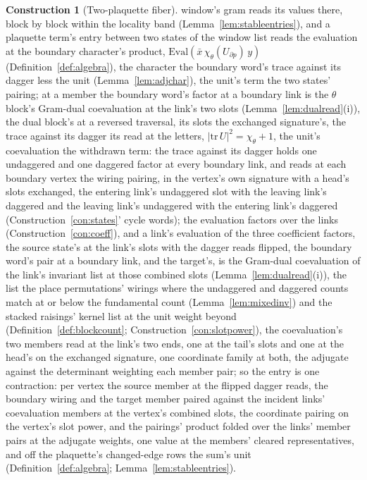 \documentclass[11pt]{article}
\theoremstyle{definition}
\newtheorem{construction}{Construction}
\begin{document}
\begin{construction}[Two-plaquette fiber]
window's gram reads its values there, block by block within the
locality band (Lemma~\ref{lem:stableentries}), and a plaquette
term's entry between two states of the window list reads the
evaluation at the boundary character's product,
$\mathrm{Eval}(\bar x\,\chi_\theta(U_{\partial p})\,y)$
(Definition~\ref{def:algebra}), the character the boundary word's
trace against its dagger less the unit (Lemma~\ref{lem:adjchar}),
the unit's term the two states' pairing; at a member the boundary
word's factor at a boundary link is the $\theta$ block's Gram-dual
coevaluation at the link's two slots (Lemma~\ref{lem:dualread}(i)),
the dual block's at a reversed traversal, its slots the exchanged
signature's, the trace against its dagger its read at the letters,
$|\mathrm{tr}\,U|^2=\chi_\theta+1$, the unit's coevaluation the
withdrawn term: the trace against its
dagger holds one undaggered and one daggered factor at every
boundary link, and reads at each boundary vertex the wiring
pairing, in the vertex's own signature with a head's slots
exchanged, the entering link's undaggered slot with the leaving
link's daggered and the leaving link's undaggered with the
entering link's daggered (Construction~\ref{con:states}' cycle
words); the evaluation factors over the links
(Construction~\ref{con:coeff}), and a link's evaluation of the
three coefficient factors, the source state's at the link's slots
with the dagger reads flipped, the boundary word's pair at a
boundary link, and the target's, is the Gram-dual coevaluation of
the link's invariant list at those combined slots
(Lemma~\ref{lem:dualread}(i)), the list the place permutations'
wirings where the undaggered and daggered counts match at or below
the fundamental count (Lemma~\ref{lem:mixedinv}) and the stacked
raisings' kernel list at the unit weight beyond
(Definition~\ref{def:blockcount}; Construction~\ref{con:slotpower}),
the coevaluation's two members read at the link's two ends, one
at the tail's slots and one at the head's on the exchanged
signature, one coordinate family at both, the adjugate
against the determinant weighting each member pair; so the entry is
one contraction: per vertex the source member at the flipped
dagger reads, the boundary wiring and the target member paired
against the incident links' coevaluation members at the vertex's
combined slots, the coordinate pairing on the vertex's slot power,
and the pairings' product folded over the links' member pairs at
the adjugate weights, one value at the members' cleared
representatives, and off the plaquette's changed-edge rows the
sum's unit (Definition~\ref{def:algebra};
Lemma~\ref{lem:stableentries}).
\end{construction}
\end{document}
